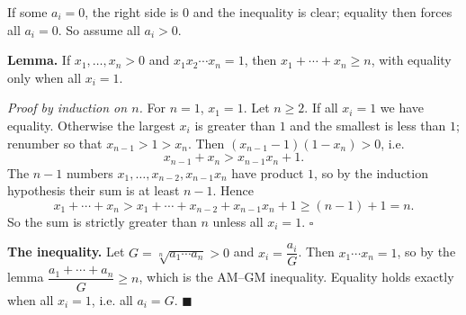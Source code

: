 If some $a_i=0$, the right side is $0$ and the inequality is clear; equality then forces all $a_i=0$. So assume all $a_i>0$.

\textbf{Lemma.} If $x_1,\dots,x_n>0$ and $x_1x_2\cdots x_n=1$, then $x_1+\cdots+x_n\ge n$, with equality only when all $x_i=1$.

\emph{Proof by induction on $n$.} For $n=1$, $x_1=1$. Let $n\ge2$. If all $x_i=1$ we have equality. Otherwise the largest $x_i$ is greater than $1$ and the smallest is less than $1$; renumber so that $x_{n-1}>1>x_n$. Then $(x_{n-1}-1)(1-x_n)>0$, i.e.
\[x_{n-1}+x_n>x_{n-1}x_n+1.\]
The $n-1$ numbers $x_1,\dots,x_{n-2},x_{n-1}x_n$ have product $1$, so by the induction hypothesis their sum is at least $n-1$. Hence
\[x_1+\cdots+x_n>x_1+\cdots+x_{n-2}+x_{n-1}x_n+1\ge(n-1)+1=n.\]
So the sum is strictly greater than $n$ unless all $x_i=1$. $\square$

\textbf{The inequality.} Let $G=\sqrt[n]{a_1\cdots a_n}>0$ and $x_i=\dfrac{a_i}{G}$. Then $x_1\cdots x_n=1$, so by the lemma $\dfrac{a_1+\cdots+a_n}{G}\ge n$, which is the AM--GM inequality. Equality holds exactly when all $x_i=1$, i.e. all $a_i=G$. $\blacksquare$
